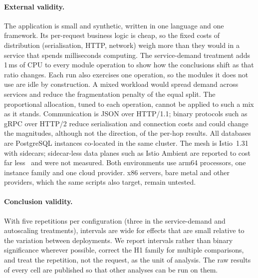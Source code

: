 \paragraph{External validity.} The application is small and synthetic, written in one language and one
framework. Its per-request business logic is cheap, so the fixed costs of distribution (serialisation, HTTP,
network) weigh more than they would in a service that spends milliseconds computing. The service-demand treatment
adds 1\,ms of CPU to every module operation to show how the conclusions shift as that ratio changes. Each run also
exercises one operation, so the modules it does not use are idle by construction. A mixed workload would spread
demand across services and reduce the fragmentation penalty of the equal split. The proportional allocation, tuned
to each operation, cannot be applied to such a mix as it stands. Communication is
JSON over HTTP/1.1; binary protocols such as gRPC over HTTP/2 reduce serialisation and connection costs and
could change the magnitudes, although not the direction, of the per-hop results. All databases are PostgreSQL
instances co-located in the same cluster. The mesh is Istio~1.31 with sidecars; sidecar-less data planes such as
Istio Ambient are reported to cost far less~\cite{BremlerBarr2025} and were not measured. Both environments use
arm64 processors, one instance family and one cloud provider. x86 servers, bare metal and other providers,
which the same scripts also target, remain untested.

\paragraph{Conclusion validity.} With five repetitions per configuration (three in the service-demand and autoscaling treatments), intervals are
wide for effects
that are small relative to the variation between deployments. We report intervals rather than binary
significance wherever possible, correct the H1 family for multiple comparisons, and treat the repetition, not
the request, as the unit of analysis. The raw results of every cell are published so that other analyses can be
run on them.
